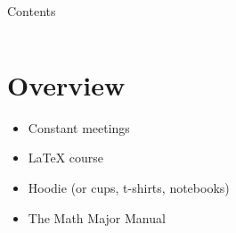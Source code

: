 \begin{frame}
    \maketitle
\end{frame}

\begin{frame}{Contents}
    \begin{columns}
        \linespread{1.75}\selectfont
         \tableofcontents
    \end{columns}
   
\end{frame}

\section{Overview}

\begin{frame}
    \begin{itemize}
        \item Constant meetings
        \item LaTeX course
        \item Hoodie (or cups, t-shirts, notebooks)
        \item The Math Major Manual
    \end{itemize}
\end{frame}